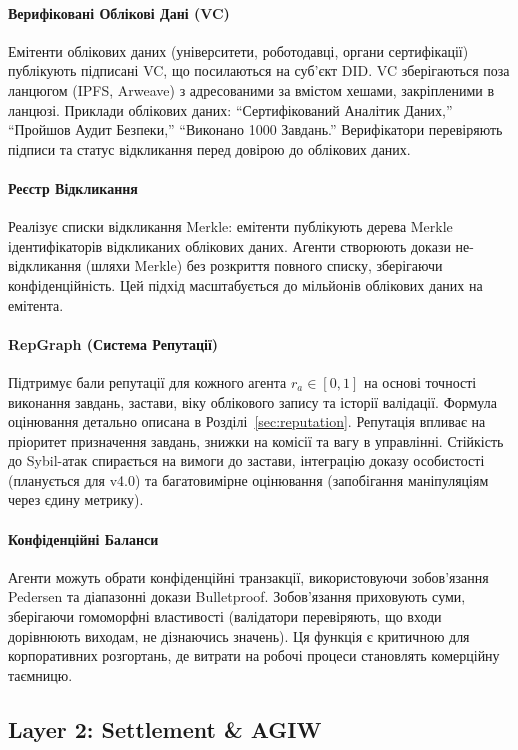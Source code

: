 \documentclass[11pt]{article}
\begin{document}
\paragraph{Верифіковані Облікові Дані (VC)} Емітенти облікових даних (університети, роботодавці, органи сертифікації) публікують підписані VC, що посилаються на суб'єкт DID. VC зберігаються поза ланцюгом (IPFS, Arweave) з адресованими за вмістом хешами, закріпленими в ланцюзі. Приклади облікових даних: ``Сертифікований Аналітик Даних,'' ``Пройшов Аудит Безпеки,'' ``Виконано 1000 Завдань.'' Верифікатори перевіряють підписи та статус відкликання перед довірою до облікових даних.

\paragraph{Реєстр Відкликання} Реалізує списки відкликання Merkle: емітенти публікують дерева Merkle ідентифікаторів відкликаних облікових даних. Агенти створюють докази не-відкликання (шляхи Merkle) без розкриття повного списку, зберігаючи конфіденційність. Цей підхід масштабується до мільйонів облікових даних на емітента.

\paragraph{RepGraph (Система Репутації)} Підтримує бали репутації для кожного агента $r_a \in [0,1]$ на основі точності виконання завдань, застави, віку облікового запису та історії валідації. Формула оцінювання детально описана в Розділі~\ref{sec:reputation}. Репутація впливає на пріоритет призначення завдань, знижки на комісії та вагу в управлінні. Стійкість до Sybil-атак спирається на вимоги до застави, інтеграцію доказу особистості (планується для v4.0) та багатовимірне оцінювання (запобігання маніпуляціям через єдину метрику).

\paragraph{Конфіденційні Баланси} Агенти можуть обрати конфіденційні транзакції, використовуючи зобов'язання Pedersen та діапазонні докази Bulletproof. Зобов'язання приховують суми, зберігаючи гомоморфні властивості (валідатори перевіряють, що входи дорівнюють виходам, не дізнаючись значень). Ця функція є критичною для корпоративних розгортань, де витрати на робочі процеси становлять комерційну таємницю.

\subsection{Layer 2: Settlement \& AGIW}
\end{document}
